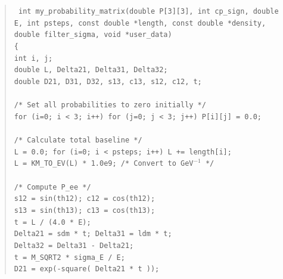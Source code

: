 \begin{quote}
{\tt
int my\_probability\_matrix(double P[3][3], int cp\_sign, double E, int psteps,
                          const double *length, const double *density,
                          double filter\_sigma, void *user\_data) \\
\{ \\
 \hspace*{0.5cm}  int i, j; \\
 \hspace*{0.5cm} double L, Delta21, Delta31, Delta32; \\
 \hspace*{0.5cm} double D21, D31, D32, s13, c13, s12, c12, t; \\
  \\
  \hspace*{0.5cm} /* Set all probabilities to zero initially */ \\
  \hspace*{0.5cm} for (i=0; i < 3; i++) for (j=0; j < 3; j++) P[i][j] = 0.0; \\
\\
 \hspace*{0.5cm} /* Calculate total baseline */ \\
 \hspace*{0.5cm} L = 0.0; for (i=0; i < psteps; i++) L += length[i]; \\
 \hspace*{0.5cm} L = KM\_TO\_EV(L) * 1.0e9;      /* Convert to GeV$^{-1}$ */ \\
\\
 \hspace*{0.5cm} /* Compute P\_ee */ \\
  \hspace*{0.5cm} s12 = sin(th12); c12 = cos(th12); \\
  \hspace*{0.5cm} s13 = sin(th13); c13 = cos(th13); \\
  \hspace*{0.5cm} t = L / (4.0 * E); \\ 
  \hspace*{0.5cm} Delta21 = sdm * t; Delta31 = ldm * t; \\
  \hspace*{0.5cm} Delta32 = Delta31 - Delta21; \\
  \hspace*{0.5cm} t = M\_SQRT2 * sigma\_E / E; \\
  \hspace*{0.5cm} D21 = exp(-square( Delta21 * t )); \\
}
\end{quote}
